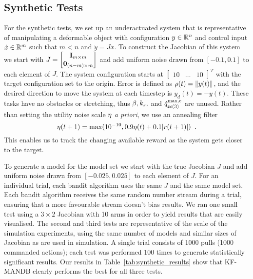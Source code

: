 \subsection{Synthetic Tests}
\label{sec:synthetic_trials}

For the synthetic tests, we set up an underactuated system that is representative of manipulating a deformable object with configuration $y \in \mathbb{R}^n$ and control input $\dot x \in \mathbb{R}^m$ such that $m < n$ and $\dot y = J \dot x$. To construct the Jacobian of this system we start with $J = \begin{bmatrix}\mathbf{I}_{m \times m} \\ \mathbf{0}_{(n-m) \times m} \end{bmatrix}$ and add uniform noise drawn from $[-0.1, 0.1]$ to each element of $J$. The system configuration starts at $\begin{bmatrix}10 & \dots & 10\end{bmatrix}^T$ with the target configuration set to the origin. Error is defined as $\rho(t) = \| y(t) \|$, and the desired direction to move the system at each timestep is $\dot y_d(t) = - y(t)$. These tasks have no obstacles or stretching, thus $\beta, k_s,$ and $\dot{q}^\textrm{max,c}_{\mathfrak{se}(3)}$ are unused. Rather than setting the utility noise scale $\eta$ \textit{a priori}, we use an annealing filter
\begin{equation}
    \eta(t+1) = \max(10^{-10}, 0.9 \eta(t) + 0.1 |r(t+1)|) \enspace.
\end{equation}
This enables us to track the changing available reward as the system gets closer to the target.

To generate a model for the model set we start with the true Jacobian $J$ and add uniform noise drawn from $[-0.025, 0.025]$ to each element of $J$. For an individual trial, each bandit algorithm uses the same $J$ and the same model set. Each bandit algorithm receives the same random number stream during a trial, ensuring that a more favourable stream doesn't bias results. We ran one small test using a $3 \times 2$ Jacobian with 10 arms in order to yield results that are easily visualised. The second and third tests are representative of the scale of the simulation experiments, using the same number of models and similar sizes of Jacobian as are used in simulation. A single trial consists of 1000 pulls (1000 commanded actions); each test was performed 100 times to generate statistically significant results. Our results in Table~\ref{tab:synthetic_results} show that KF-MANDB clearly performs the best for all three tests.


